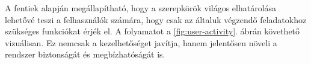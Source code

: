 A fentiek alapján megállapítható, hogy a szerepkörök világos elhatárolása lehetővé teszi a felhasználók számára, hogy csak az általuk végzendő feladatokhoz szükséges funkciókat érjék el. A folyamatot a \ref{fig:user-activity}. ábrán követhető vizuálisan. Ez nemcsak a kezelhetőséget javítja, hanem jelentősen növeli a rendszer biztonságát és megbízhatóságát is.





